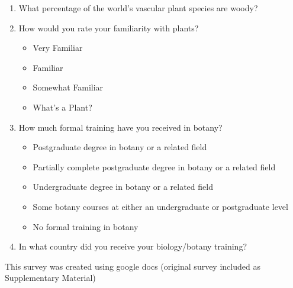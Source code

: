 \documentclass[12pt]{article}
\begin{document}
\begin{enumerate}

\item What percentage of the world's vascular plant species are woody?

\item How would you rate your familiarity with plants?

	\begin{itemize}
	
		\item Very Familiar
	
		\item Familiar
	
		\item Somewhat Familiar
	
		\item What's a Plant?
	
	\end{itemize}
	
\item How much formal training have you received in botany?

	\begin{itemize}
	
		\item Postgraduate degree in botany or a related field
		
		\item Partially complete postgraduate degree in botany or a related field
		
		\item Undergraduate degree in botany or a related field
		
		\item Some botany courses at either an undergraduate or postgraduate level
		
		\item No formal training in botany
		
	\end{itemize}
	
\item In what country did you receive your biology/botany training?
\end{enumerate}

This survey was created using google docs (original survey included as
Supplementary Material)



\end{document}
